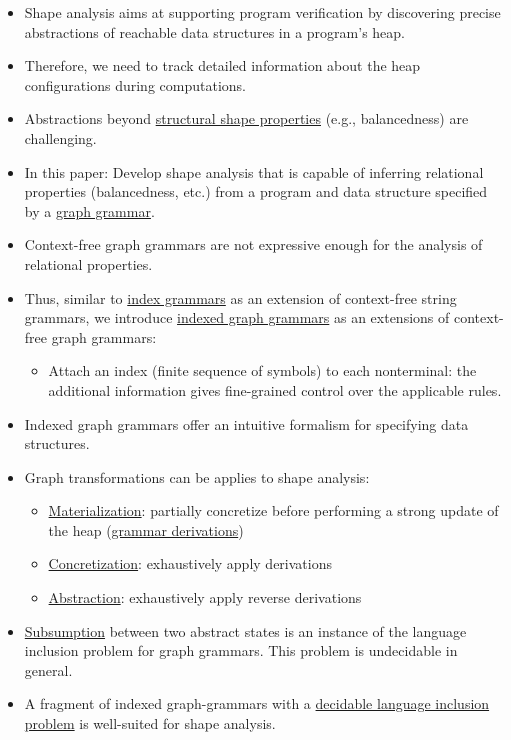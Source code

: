 \documentclass[a4paper,12pt]{article}
\begin{document}
\begin{itemize}
	\item Shape analysis aims at supporting program verification by discovering precise abstractions of reachable data structures in a program's heap.
	\item Therefore, we need to track detailed information about the heap configurations during computations.
	\item Abstractions beyond \ul{structural shape properties} (e.g., balancedness) are challenging.
	\item In this paper: Develop shape analysis that is capable of inferring relational properties (balancedness, etc.) from a program and data structure specified by a \ul{graph grammar}.
	\item Context-free graph grammars are not expressive enough for the analysis of relational properties.
	\item Thus, similar to \ul{index grammars} as an extension of context-free string grammars, we introduce \ul{indexed graph grammars} as an extensions of context-free graph grammars:
	\begin{itemize}
		\item Attach an index (finite sequence of symbols) to each nonterminal: the additional information gives fine-grained control over the applicable rules.
	\end{itemize}
	\item Indexed graph grammars offer an intuitive formalism for specifying data structures.
	\item Graph transformations can be applies to shape analysis:
	\begin{itemize}
		\item \ul{Materialization}: partially concretize before performing a strong update of the heap (\ul{grammar derivations})
		\item \ul{Concretization}: exhaustively apply derivations
		\item \ul{Abstraction}: exhaustively apply reverse derivations
	\end{itemize}
	\item \ul{Subsumption} between two abstract states is an instance of the language inclusion problem for graph grammars. This problem is undecidable in general.
	\item A fragment of indexed graph-grammars with a \ul{decidable language inclusion problem} is well-suited for shape analysis.
\end{itemize}
\end{document}
